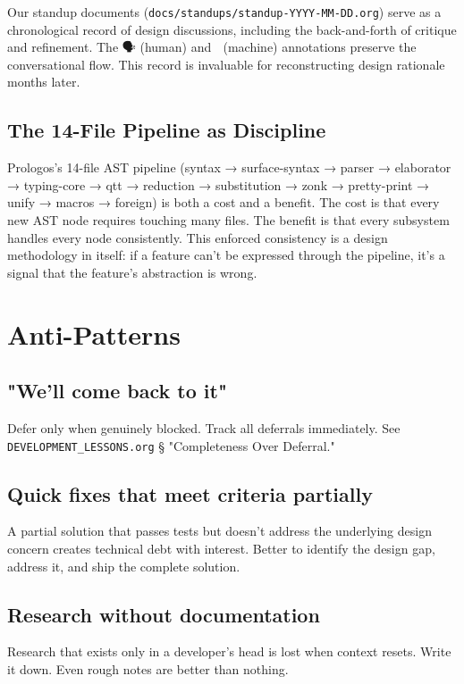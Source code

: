 \documentclass[11pt]{article}
\begin{document}
Our standup documents (\texttt{docs/standups/standup-YYYY-MM-DD.org}) serve as
a chronological record of design discussions, including the back-and-forth
of critique and refinement. The 🗣️ (human) and 🤖 (machine) annotations
preserve the conversational flow. This record is invaluable for
reconstructing design rationale months later.
\subsection{The 14-File Pipeline as Discipline}
\label{sec:orgaca980a}

Prologos's 14-file AST pipeline (syntax → surface-syntax → parser →
elaborator → typing-core → qtt → reduction → substitution → zonk →
pretty-print → unify → macros → foreign) is both a cost and a benefit.
The cost is that every new AST node requires touching many files. The
benefit is that every subsystem handles every node consistently. This
enforced consistency is a design methodology in itself: if a feature
can't be expressed through the pipeline, it's a signal that the
feature's abstraction is wrong.
\section{Anti-Patterns}
\label{sec:org7a8f38d}

\subsection{"We'll come back to it"}
\label{sec:org2ed5d93}

Defer only when genuinely blocked. Track all deferrals immediately.
See \texttt{DEVELOPMENT\_LESSONS.org} § "Completeness Over Deferral."
\subsection{Quick fixes that meet criteria partially}
\label{sec:orgea3405b}

A partial solution that passes tests but doesn't address the underlying
design concern creates technical debt with interest. Better to identify
the design gap, address it, and ship the complete solution.
\subsection{Research without documentation}
\label{sec:org65dd746}

Research that exists only in a developer's head is lost when context
resets. Write it down. Even rough notes are better than nothing.
\end{document}
